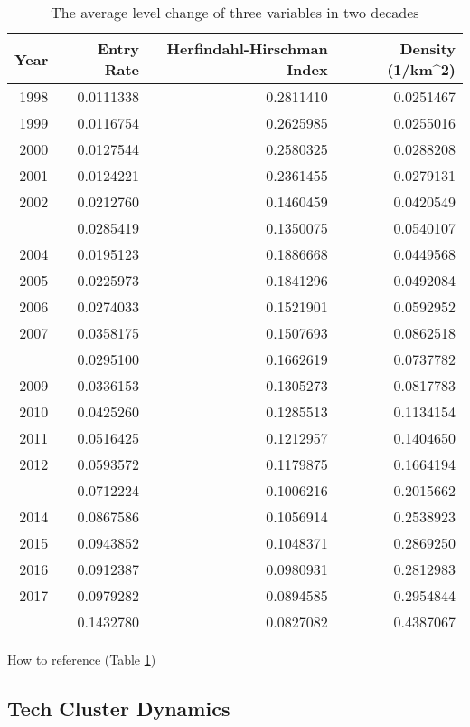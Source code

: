 \documentclass[
  12pt,
  oneside]{book}
\begin{document}
\begin{table}

\caption{\label{tab:tab-all-var-trend}The average level change of three variables in two decades}
\centering
\begin{tabular}[t]{rrrr}
\toprule
\textbf{Year} & \textbf{Entry Rate} & \textbf{Herfindahl-Hirschman Index} & \textbf{Density (1/km\textasciicircum{}2)}\\
\midrule
1998 & 0.0111338 & 0.2811410 & 0.0251467\\
1999 & 0.0116754 & 0.2625985 & 0.0255016\\
2000 & 0.0127544 & 0.2580325 & 0.0288208\\
2001 & 0.0124221 & 0.2361455 & 0.0279131\\
2002 & 0.0212760 & 0.1460459 & 0.0420549\\
\addlinespace
2003 & 0.0285419 & 0.1350075 & 0.0540107\\
2004 & 0.0195123 & 0.1886668 & 0.0449568\\
2005 & 0.0225973 & 0.1841296 & 0.0492084\\
2006 & 0.0274033 & 0.1521901 & 0.0592952\\
2007 & 0.0358175 & 0.1507693 & 0.0862518\\
\addlinespace
2008 & 0.0295100 & 0.1662619 & 0.0737782\\
2009 & 0.0336153 & 0.1305273 & 0.0817783\\
2010 & 0.0425260 & 0.1285513 & 0.1134154\\
2011 & 0.0516425 & 0.1212957 & 0.1404650\\
2012 & 0.0593572 & 0.1179875 & 0.1664194\\
\addlinespace
2013 & 0.0712224 & 0.1006216 & 0.2015662\\
2014 & 0.0867586 & 0.1056914 & 0.2538923\\
2015 & 0.0943852 & 0.1048371 & 0.2869250\\
2016 & 0.0912387 & 0.0980931 & 0.2812983\\
2017 & 0.0979282 & 0.0894585 & 0.2954844\\
\addlinespace
2018 & 0.1432780 & 0.0827082 & 0.4387067\\
\bottomrule
\end{tabular}
\end{table}

How to reference (Table \ref{tab:tab-all-var-trend})

\hypertarget{tech-cluster-dynamics}{%
\subsection{Tech Cluster Dynamics}\label{tech-cluster-dynamics}}
\end{document}
